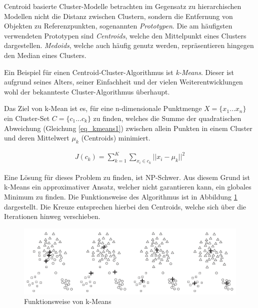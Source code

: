 Centroid basierte Cluster-Modelle betrachten im Gegensatz zu hierarchischen Modellen nicht die Distanz
zwischen Clustern, sondern die Entfernung von Objekten zu Referenzpunkten, sogenannten \textit{Prototypen}.
Die am häufigsten verwendeten Prototypen sind \textit{Centroids}, welche den Mittelpunkt eines Clusters dargestellen.
\textit{Medoids}, welche auch häufig genutz werden, repräsentieren hingegen den Median eines Clusters.

Ein Beispiel für einen Centroid-Cluster-Algorithmus ist \textit{k-Means}. Dieser ist aufgrund seines Alters,
seiner Einfachheit und der vielen Weiterentwicklungen wohl der bekannteste Cluster-Algorithmus überhaupt.

Das Ziel von k-Mean ist es, für eine n-dimensionale Punktmenge $X = \{ x_1 ... x_n \}$ ein Cluster-Set $C = \{ c_1 ... c_k \}$
zu finden, welches die Summe der quadratischen Abweichung (Gleichung \ref{eq_kmeans1}) zwischen allein Punkten in einem Cluster und deren
Mittelwert $\mu_k$ (Centroids) minimiert.

\begin{ceqn}
\begin{align}
    \label{eq_kmeans1}
    J(c_k) = \sum_{k=1}^K \sum_{x_i \in c_k} || x_i - \mu_k ||^2
\end{align}
\end{ceqn}

Eine Lösung für dieses Problem zu finden, ist NP-Schwer. Aus diesem Grund
ist k-Means ein approximativer Ansatz, welcher nicht garantieren kann, ein globales Minimum zu finden.
Die Funktionsweise des Algorithmus ist in Abbildung \ref{fig:grund_kmeans_clustering} dargestellt.
Die Kreuze entsprechen hierbei den Centroids, welche sich über die Iterationen hinweg verschieben.

\begin{figure}[H]
    \centering
    \includegraphics[width=0.9\linewidth]{resources/img/grundlagen/k-means}
    \caption[Funktionsweise von k-Means]{Funktionsweise von k-Means \cite[]{tan2007introduction}}
    \label{fig:grund_kmeans_clustering}
\end{figure}

